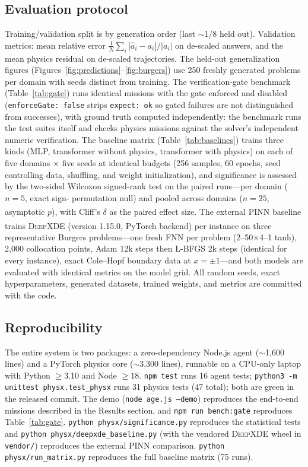 \documentclass[11pt,a4paper]{article}
\newcommand{\pn}{\textsuperscript}
\begin{document}
\subsection*{Evaluation protocol}

Training/validation split is by generation order (last $\sim$1/8 held out).
Validation metrics: mean relative error
$\frac{1}{N}\sum_i |\hat a_i - a_i|/|a_i|$ on de-scaled answers, and the mean
physics residual on de-scaled trajectories. The held-out generalization
figures (Figures~\ref{fig:predictions}--\ref{fig:burgers}) use 250 freshly
generated problems per domain with seeds distinct from training. The
verification-gate benchmark (Table~\ref{tab:gate}) runs identical missions
with the gate enforced and disabled (\texttt{enforceGate: false} strips
\texttt{expect: ok} so gated failures are not distinguished from
successes), with ground truth computed independently: the benchmark runs
the test suites itself and checks physics missions against the solver's
independent numeric verification. The baseline matrix (Table~\ref{tab:baselines})
trains three kinds (MLP, transformer without physics, transformer with
physics) on each of five domains $\times$ five seeds at identical budgets
(256 samples, 60 epochs, seed controlling data, shuffling, and weight
initialization), and significance is assessed by the two-sided Wilcoxon
signed-rank test on the paired runs---per domain ($n=5$, exact sign-
permutation null) and pooled across domains ($n=25$, asymptotic
$p$)\pn{\citep{wilcoxon1945}}, with Cliff's $\delta$ as the paired effect
size. The external PINN baseline trains \textsc{DeepXDE}\pn{\citep{lu2021}}
(version 1.15.0, PyTorch backend) per instance on three representative
Burgers problems---one fresh FNN per problem (2--50$\times$4--1 tanh),
2{,}000 collocation points, Adam 12k steps then L-BFGS 2k steps (identical
for every instance), exact Cole--Hopf boundary data at
$x=\pm1$---and both models are evaluated with identical metrics on the
model grid. All random seeds, exact hyperparameters, generated datasets,
trained weights, and metrics are committed with the code.

\subsection*{Reproducibility}

The entire system is two packages: a zero-dependency Node.js agent
($\sim$1,600 lines) and a PyTorch physics core ($\sim$3,300 lines), runnable on
a CPU-only laptop with Python $\geq$3.10 and Node $\geq$18. \texttt{npm test}
runs 16 agent tests; \texttt{python3 -m unittest physx.test\_physx} runs 31
physics tests (47 total); both are green in the released commit. The demo
(\texttt{node age.js --demo}) reproduces the end-to-end missions described in
the Results section, and \texttt{npm run bench:gate} reproduces
Table~\ref{tab:gate}. \texttt{python physx/significance.py} reproduces the
statistical tests and \texttt{python physx/deepxde\_baseline.py} (with the
vendored \textsc{DeepXDE} wheel in \texttt{vendor/}) reproduces the
external PINN comparison. \texttt{python physx/run\_matrix.py} reproduces
the full baseline matrix (75 runs).
\end{document}
